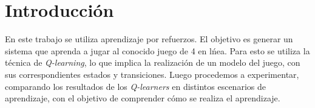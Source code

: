 \section{Introducción}

En este trabajo se utiliza aprendizaje por refuerzos. El objetivo es generar un sistema que aprenda a jugar al conocido juego de 4 en l\'nea. Para esto se utiliza la técnica de \emph{Q-learning}, lo que implica la realizaci\'on de un modelo del juego, con sus correspondientes estados y transiciones. Luego procedemos a experimentar, comparando los resultados de los \emph{Q-learners} en distintos escenarios de aprendizaje, con el objetivo de comprender cómo se realiza el aprendizaje.
